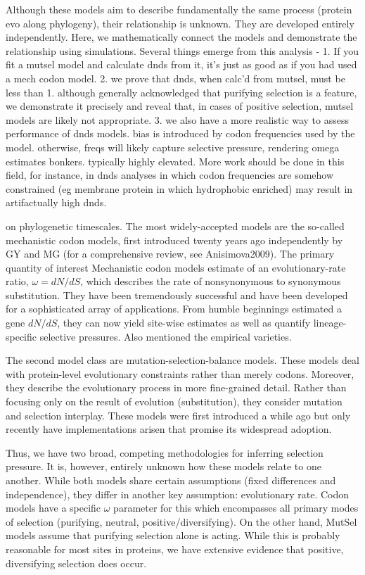 \documentclass[11pt]{article}
\begin{document}
Although these models aim to describe fundamentally the same process (protein evo along phylogeny), their relationship is unknown. They are developed entirely independently.
Here, we mathematically connect the models and demonstrate the relationship using simulations. Several things emerge from this analysis - 
1. If you fit a mutsel model and calculate dnds from it, it's just as good as if you had used a mech codon model. 
2. we prove that dnds, when calc'd from mutsel, must be less than 1. although generally acknowledged that purifying selection is a feature, we demonstrate it precisely and reveal that, in cases of positive selection, mutsel models are likely not appropriate.
3. we also have a more realistic way to assess performance of dnds models. bias is introduced by codon frequencies used by the model. otherwise, freqs will likely capture selective pressure, rendering omega estimates bonkers. typically highly elevated. More work should be done in this field, for instance, in dnds analyses in which codon frequencies are somehow constrained (eg membrane protein in which hydrophobic enriched) may result in artifactually high dnds.

on phylogenetic timescales. The most widely-accepted models are the so-called mechanistic codon models, first introduced twenty years ago independently by GY and MG (for a comprehensive review, see Anisimova2009). The primary quantity of interest Mechanistic codon models estimate of an evolutionary-rate ratio, $\omega = dN/dS$, which describes the rate of nonsynonymous to synonymous substitution. They have been tremendously successful and have been developed for a sophisticated array of applications. From humble beginnings estimated a gene $dN/dS$, they can now yield site-wise estimates as well as quantify lineage-specific selective pressures. Also mentioned the empirical varieties.
	
The second model class are mutation-selection-balance models. These models deal with protein-level evolutionary constraints rather than merely codons. Moreover, they describe the evolutionary process in more fine-grained detail. Rather than focusing only on the result of evolution (substitution), they consider mutation and selection interplay. These models were first introduced a while ago but only recently have implementations arisen that promise its widespread adoption.

Thus, we have two broad, competing methodologies for inferring selection pressure. It is, however, entirely unknown how these models relate to one another. While both models share certain assumptions (fixed differences and independence), they differ in another key assumption: evolutionary rate. Codon models have a specific $\omega$ parameter for this which encompasses all primary modes of selection (purifying, neutral, positive/diversifying). On the other hand, MutSel models assume that purifying selection alone is acting. While this is probably reasonable for most sites in proteins, we have extensive evidence that positive, diversifying selection does occur. 
\end{document}

